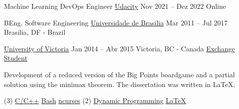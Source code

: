 \par
{}

\cveducation
{Machine Learning DevOps Engineer}
{\href{https://confirm.udacity.com/VWERCDCT}{Udacity}}
{Nov 2021 -- Dez 2022}
{Online}
{}

\bigskip

\cveducation
{BEng. Software Engineering}
{\href{https://fga.unb.br/software}{Universidade de Brasilia}}
{Mar 2011 -- Jul 2017}
{Brasilia, DF - Brazil}
{}

\smallskip

\cveducation
{}
{\href{https://www.uvic.ca/}{University of Victoria}}
{Jan 2014 -- Abr 2015}
{Victoria, BC - Canada}
{\href{http://www.cienciasemfronteiras.gov.br/web/csf/o-programa}{Exchange Student}}
\smallskip


\bigskip



{\smallskip\justifying
{\color{description}Development of a reduced version of the Big Points boardgame and a partial solution using the minimax theorem. The dissertation was written in \LaTeX.}
\par}

\vspace{-0.5mm}
\begin{tasks}[after-item-skip=-0.5mm, label-offset=0.5mm, item-indent=5.0mm, label-align=left, label={\scriptsize\faCode}, label-format={\scriptsize\color{tech}}, item-format={\bfseries\footnotesize\color{emphasis}}](3)
	\task \href{https://www.cplusplus.com/}{C/C++}
	\task \href{https://www.gnu.org/software/bash/}{Bash}
	\task \href{https://invisible-island.net/ncurses/announce.html}{ncurses}
	\task*(2) \href{https://en.wikipedia.org/wiki/Dynamic_programming}{Dynamic Programming}
	\task \href{https://www.latex-project.org/}{\LaTeX}
\end{tasks}

\bigskip


